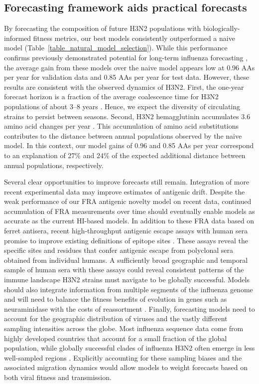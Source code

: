 \subsection*{Forecasting framework aids practical forecasts}

By forecasting the composition of future H3N2 populations with biologically-informed fitness metrics, our best models consistently outperformed a naive model (Table~\ref{table_natural_model_selection}).
While this performance confirms previously demonstrated potential for long-term influenza forecasting \cite{Luksza:2014hj}, the average gain from these models over the naive model appears low at 0.96 AAs per year for validation data and 0.85 AAs per year for test data.
However, these results are consistent with the observed dynamics of H3N2.
First, the one-year forecast horizon is a fraction of the average coalescence time for H3N2 populations of about 3--8 years \cite{Rambaut:2008ew}.
Hence, we expect the diversity of circulating strains to persist between seasons.
Second, H3N2 hemagglutinin accumulates 3.6 amino acid changes per year \cite{Smith:2004jc}.
This accumulation of amino acid substitutions contributes to the distance between annual populations observed by the naive model.
In this context, our model gains of 0.96 and 0.85 AAs per year correspond to an explanation of 27\% and 24\% of the expected additional distance between annual populations, respectively.

Several clear opportunities to improve forecasts still remain.
Integration of more recent experimental data may improve estimates of antigenic drift.
Despite the weak performance of our FRA antigenic novelty model on recent data, continued accumulation of FRA measurements over time should eventually enable models as accurate as the current HI-based models.
In addition to these FRA data based on ferret antisera, recent high-throughput antigenic escape assays with human sera promise to improve existing definitions of epitope sites \cite{Lee2019}.
These assays reveal the specific sites and residues that confer antigenic escape from polyclonal sera obtained from individual humans.
A sufficiently broad geographic and temporal sample of human sera with these assays could reveal consistent patterns of the immune landscape H3N2 strains must navigate to be globally successful.
Models should also integrate information from multiple segments of the influenza genome and will need to balance the fitness benefits of evolution in genes such as neuraminidase \cite{Chen:2018kp} with the costs of reassortment \cite{Villa:2017iw}.
Finally, forecasting models need to account for the geographic distribution of viruses and the vastly different sampling intensities across the globe.
Most influenza sequence data come from highly developed countries that account for a small fraction of the global population, while globally successful clades of influenza H3N2 often emerge in less well-sampled regions \cite{Russell:2008ke,Rambaut:2008ew,Bedford:2015fj}.
Explicitly accounting for these sampling biases and the associated migration dynamics would allow models to weight forecasts based on both viral fitness and transmission.

